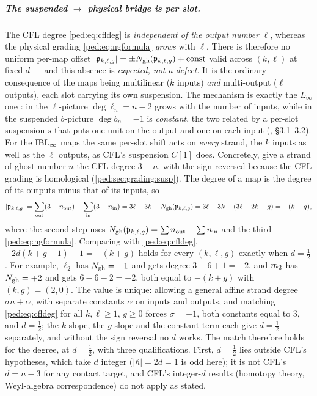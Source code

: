 \subparagraph{The suspended \texorpdfstring{$\to$}{->} physical bridge is \emph{per slot}.}
The CFL degree \eqref{ped:eq:cfldeg} is \emph{independent of the output number} $\ell$, whereas the physical grading \eqref{ped:eq:ngformula} \emph{grows} with $\ell$.
There is therefore no uniform per-map offset $|\mathfrak{p}_{k,\ell,g}|=\pm N_{\text{gh}}(\mathfrak{p}_{k,\ell,g})+\text{const}$ valid across $(k,\ell)$ at fixed $d$ --- and this absence is \emph{expected, not a defect}.
It is the ordinary consequence of the maps being multilinear ($k$ inputs) \emph{and} multi-output ($\ell$ outputs), each slot carrying its own suspension.
The mechanism is exactly the $L_\infty$ one \cite{Hohm:2017:LinftyAlgebrasField}: in the $\ell$-picture $\deg\ell_n=n-2$ grows with the number of inputs, while in the suspended $b$-picture $\deg b_n=-1$ is \emph{constant}, the two related by a per-slot suspension $s$ that puts one unit on the output and one on each input (\cite{Hohm:2017:LinftyAlgebrasField}, \S 3.1--3.2).
For the $\mathrm{IBL}_\infty$ maps the same per-slot shift acts on \emph{every} strand, the $k$ inputs as well as the $\ell$ outputs, as CFL's suspension $C[1]$ does.
Concretely, give a strand of ghost number $n$ the CFL degree $3-n$, with the sign reversed because the CFL grading is homological (\cref{ped:sec:grading:susp}).
The degree of a map is the degree of its outputs minus that of its inputs, so
\begin{equation}
  |\mathfrak{p}_{k,\ell,g}|
    = \sum_{\text{out}}(3-n_{\rm out})-\sum_{\text{in}}(3-n_{\rm in})
    = 3\ell-3k-N_{\text{gh}}(\mathfrak{p}_{k,\ell,g})
    = 3\ell-3k-(3\ell-2k+g)
    = -(k+g),
  \label{ped:eq:cflmatch}
\end{equation}
where the second step uses $N_{\text{gh}}(\mathfrak{p}_{k,\ell,g})=\sum n_{\rm out}-\sum n_{\rm in}$ and the third \eqref{ped:eq:ngformula}.
Comparing with \eqref{ped:eq:cfldeg}, $-2d(k+g-1)-1=-(k+g)$ holds for every $(k,\ell,g)$ exactly when $d=\tfrac12$.
For example, $\ell_2$ has $N_{\text{gh}}=-1$ and gets degree $3-6+1=-2$, and $m_2$ has $N_{\text{gh}}=+2$ and gets $6-6-2=-2$, both equal to $-(k+g)$ with $(k,g)=(2,0)$.
The value is unique: allowing a general affine strand degree $\sigma n+\alpha$, with separate constants $\alpha$ on inputs and outputs, and matching \eqref{ped:eq:cfldeg} for all $k,\ell\ge1$, $g\ge0$ forces $\sigma=-1$, both constants equal to $3$, and $d=\tfrac12$; the $k$-slope, the $g$-slope and the constant term each give $d=\tfrac12$ separately, and without the sign reversal no $d$ works.
The match therefore holds for the degree, at $d=\tfrac12$, with three qualifications.
First, $d=\tfrac12$ lies outside CFL's hypotheses, which take $d$ integer ($|\hbar|=2d=1$ is odd here); it is not CFL's $d=n-3$ for any contact target, and CFL's integer-$d$ results (homotopy theory, Weyl-algebra correspondence) do not apply as stated.
